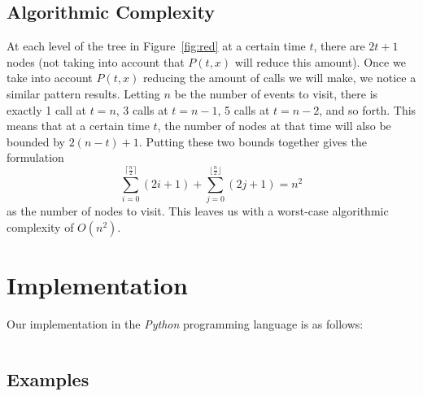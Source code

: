 \documentclass[titlepage,12pt]{article}
\begin{document}
\inputminted{python3}{dp.py}

\subsection{Algorithmic Complexity}

At each level of the tree in Figure~\ref{fig:red} at a certain time $t$, there
are $2t + 1$ nodes (not taking into account that $P(t, x)$ will reduce this
amount). Once we take into account $P(t, x)$ reducing the amount of calls we
will make, we notice a similar pattern results. Letting $n$ be the number of
events to visit, there is exactly 1 call at $t = n$, 3 calls at $t = n -1$, 5
calls at $t = n - 2$, and so forth. This means that at a certain time $t$, the
number of nodes at that time will also be bounded by $2(n - t) + 1$. Putting
these two bounds together gives the formulation
\begin{displaymath}
    \sum_{i=0}^{\lceil \frac{n}{2} \rceil} (2i + 1) +
    \sum_{j=0}^{\lfloor \frac{n}{2} \rfloor} (2j + 1) = n^2
\end{displaymath}
as the number of nodes to visit. This leaves us with a worst-case algorithmic
complexity of $O(n^2)$.

\section{Implementation}

Our implementation in the \emph{Python} programming language is as follows:

\inputminted{python3}{dp.py}

\subsection{Examples}


\end{document}
